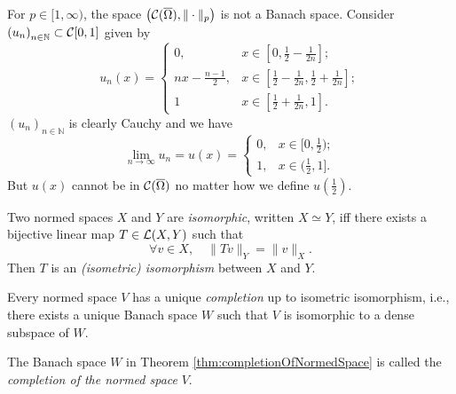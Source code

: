 \begin{exm}
  \label{exm:CpIsNotComplete}
  For $p\in[1,\infty)$, 
  the space $\left({\cal C}(\overline{\Omega}), \|\cdot\|_{p}\right)$
  is not a Banach space. 
  Consider %
  $\left(u_n\right)_{n\in \mathbb{N}}\subset
  {\cal C}[0,1]$
  given by
  \begin{equation}
    \label{eq:CpIsNotComplete}
    u_n(x) =
    \begin{cases}
      0, & x\in [0,\frac{1}{2}-\frac{1}{2n}];
      \\
      nx - \frac{n-1}{2}, & x\in [\frac{1}{2}-\frac{1}{2n},
      \frac{1}{2}+\frac{1}{2n}];
      \\
      1 & x\in [\frac{1}{2}+\frac{1}{2n},1].
    \end{cases}
  \end{equation}
  $(u_n)_{n\in \mathbb{N}}$ is clearly Cauchy
  and we have
  \begin{displaymath}
    \lim_{n\rightarrow \infty} u_n = u(x) =
    \begin{cases}
      0, & x\in [0, \frac{1}{2});
      \\
      1, & x\in (\frac{1}{2}, 1].
    \end{cases}
  \end{displaymath}
  But $u(x)$ cannot be in ${\cal C}(\overline{\Omega})$
  no matter how we define $u(\frac{1}{2})$.
\end{exm}

\begin{defn}
  \label{def:isomorphicN0ormedSpaces}
  Two normed spaces $X$ and $Y$
  are \emph{isomorphic}, written $X\simeq Y$, 
  iff there exists a bijective linear map
  $T\in {\cal L}(X, Y)$ such that
  \begin{equation}
    \label{eq:isometricIsomorphism}
    \forall v\in X,\quad \|T v\|_Y = \|v\|_X.
  \end{equation}
  Then $T$ is an \emph{(isometric) isomorphism}
  between $X$ and $Y$.
\end{defn}

\begin{thm}
  \label{thm:completionOfNormedSpace}
  Every normed space $V$ has a unique \emph{completion}
  up to isometric isomorphism,
  i.e., 
  there exists a unique Banach space $W$
  such that $V$ is isomorphic to a dense subspace of $W$.
\end{thm}

\begin{defn}
  \label{def:completionOfNormedSpace}
  The Banach space $W$ in Theorem \ref{thm:completionOfNormedSpace}
  is called the \emph{completion of the normed space} $V$.  
\end{defn}

